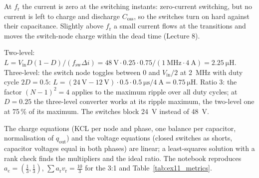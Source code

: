 
\begin{solutionblock}
	At $f_\mathrm{r}$ the current is zero at the switching instants: zero-current switching, but no current is left to charge and discharge $C_\mathrm{oss}$, so the switches turn on hard against their capacitance. Slightly above $f_\mathrm{r}$ a small current flows at the transitions and moves the switch-node charge within the dead time (Lecture 8).
\end{solutionblock}


\begin{solutionblock}
	Two-level: $L=V_\mathrm{in}D(1-D)/(f_\mathrm{sw}\Delta i)=\SI{48}{\volt}\cdot0.25\cdot0.75/(\SI{1}{\mega\hertz}\cdot\SI{4}{\ampere})=\SI{2.25}{\micro\henry}$. Three-level: the switch node toggles between 0 and $V_\mathrm{in}/2$ at \SI{2}{\mega\hertz} with duty cycle $2D=0.5$: $L=(\SI{24}{\volt}-\SI{12}{\volt})\cdot0.5\cdot\SI{0.5}{\micro\second}/\SI{4}{\ampere}=\SI{0.75}{\micro\henry}$. Ratio 3: the factor $(N-1)^2=4$ applies to the maximum ripple over all duty cycles; at $D=0.25$ the three-level converter works at its ripple maximum, the two-level one at 75\,\% of its maximum. The switches block \SI{24}{\volt} instead of \SI{48}{\volt}.
\end{solutionblock}




\begin{solutionblock}
	The charge equations (KCL per node and phase, one balance per capacitor, normalisation of $q_\mathrm{out}$) and the voltage equations (closed switches as shorts, capacitor voltages equal in both phases) are linear; a least-squares solution with a rank check finds the multipliers and the ideal ratio. The notebook reproduces $a_\mathrm{c}=(\tfrac13,\tfrac13)$, $\sum a_\mathrm{r}v_\mathrm{r}=\tfrac{10}{3}$ for the 3:1 and Table~\ref{tab:ex11_metrics}.
\end{solutionblock}

